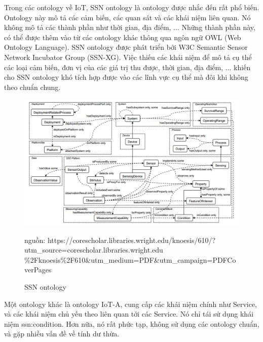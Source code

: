 Trong các ontology về IoT, SSN ontology là ontology được nhắc đến rất phổ biến. Ontology này mô tả các cảm biến, các quan sát và các khái niệm liên quan. Nó không mô tả các thành phần như thời gian, địa điểm, ... Những thành phần này, có thể được thêm vào từ các ontology khác thông qua ngôn ngữ OWL (Web Ontology Language).
SSN ontology được phát triển bởi W3C Semantic Sensor Network Incubator Group (SSN-XG). Việc thiếu các khái niệm để mô tả cụ thể các loại cảm biến, đơn vị của các giá trị thu được, thời gian, địa điểm, ... khiến cho SSN ontology khó tích hợp được vào các lĩnh vực cụ thể mà đôi khi không theo chuẩn chung.

\begin{figure}[h!]
	\center
	\includegraphics[scale=0.4]{image/ssn_ontology} \\
	\caption{SSN ontology}
	\small nguồn: https://corescholar.libraries.wright.edu/knoesis/610/?utm\_source=corescholar.libraries.wright.edu \%2Fknoesis\%2F610\&utm\_medium=PDF\&utm\_campaign=PDFCoverPages
\end{figure}

Một ontology khác là ontology IoT-A, cung cấp các khái niệm chính như Service, và các khái niệm chủ yếu theo liên quan tới các Service. Nó chỉ tái sử dụng khái niệm ssn:condition. Hơn nữa, nó rất phức tạp, không sử dụng các ontology chuẩn, và gặp nhiều vấn đề về tính dư thừa. 
\clearpage

